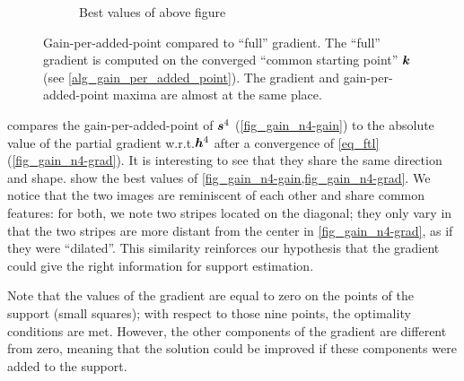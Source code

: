 \begin{figure}[!ht]
\begin{subfigure}[b]{0.34\linewidth}
	\caption{Best values of above figure}\label{fig_gain_n4-grad_best}
	\end{subfigure}
\caption{Gain-per-added-point compared to “full” gradient. The “full” gradient is computed on the converged “common starting point” $\bm{k}$ (see \cref{alg_gain_per_added_point}). The gradient and gain-per-added-point maxima are almost at the same place. }\label{fig_gain_n4}
\end{figure}

\noindent
{} compares the gain-per-added-point of $\bm{s}^4$ (\cref{fig_gain_n4-gain}) to the absolute value of the partial gradient w.r.t.\@ $\bm{h}^4$ after a convergence of \eqref{eq_ftl} (\cref{fig_gain_n4-grad}). It is interesting to see that they share the same direction and shape.  show the best values of \cref{fig_gain_n4-gain,fig_gain_n4-grad}. We notice that the two images are reminiscent of each other and share common features: for both, we note two stripes located on the  diagonal; they only vary in that the two stripes are more distant from the center in \cref{fig_gain_n4-grad}, as if they were “dilated”. This similarity reinforces our hypothesis that the gradient could give the right information for support estimation.

\noindent
Note that the values of the gradient are equal to zero on the points of the support (small squares); with respect to those nine points, the optimality conditions are met. However, the other components of the gradient are different from zero, meaning that the solution could be improved if these components were added to the support.


